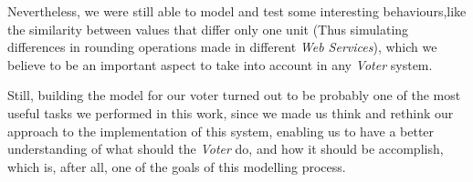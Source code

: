     Nevertheless, we were still able to model and test some interesting behaviours,like the similarity between values that differ only one unit (Thus simulating differences in rounding operations made in different \emph{Web Services}), which we believe to be an important aspect to take into account in any \emph{Voter} system.
    
    Still, building the model for our voter turned out to be probably one of the most useful tasks we performed in this work, since we made us think and rethink our approach to the implementation of this system, enabling us to have a better understanding of what should the \emph{Voter} do, and how it should be accomplish, which is, after all, one of the goals of this modelling process.